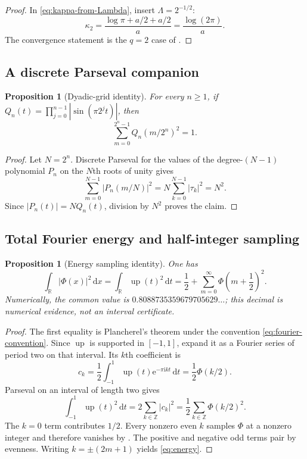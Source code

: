 \documentclass[11pt,oneside]{article}
\numberwithin{equation}{section}
\newtheorem{proposition}[theorem]{Proposition}
\theoremstyle{definition}
\theoremstyle{remark}
\newcommand{\R}{\mathbb R}
\newcommand{\Z}{\mathbb Z}
\newcommand{\e}{\mathrm e}
\newcommand{\ii}{\mathrm i}
\newcommand{\dd}{\,\mathrm d}
\newcommand{\up}{\operatorname{up}}
\newcommand{\PhiUp}{\Phi}
\newcommand{\TM}{\tau}
\begin{document}
\begin{proof}
In \eqref{eq:kappa-from-Lambda}, insert \(\Lambda=2^{-1/2}\):
\[
 \kappa_2=\frac{\log\pi+a/2+a/2}{a}=\frac{\log(2\pi)}{a}.
\]
The convergence statement is the \(q=2\) case of .
\end{proof}

\subsection{A discrete Parseval companion}

\begin{proposition}[Dyadic-grid identity]
\label{prop:grid-parseval}
For every \(n\ge1\), if
\(Q_n(t)=\prod_{j=0}^{n-1}|\sin(\pi2^jt)|\), then
\begin{equation}
 \sum_{m=0}^{2^n-1}Q_n(m/2^n)^2=1.
 \label{eq:grid-parseval}
\end{equation}
\end{proposition}

\begin{proof}
Let \(N=2^n\).  Discrete Parseval for the values of the degree-\((N-1)\) polynomial
\(P_n\) on the \(N\)th roots of unity gives
\[
 \sum_{m=0}^{N-1}|P_n(m/N)|^2
 =N\sum_{k=0}^{N-1}|\TM_k|^2=N^2.
\]
Since \(|P_n(t)|=NQ_n(t)\), division by \(N^2\) proves the claim.
\end{proof}

\subsection{Total Fourier energy and half-integer sampling}

\begin{proposition}[Energy sampling identity]
\label{prop:energy}
One has
\begin{equation}
 \int_{\R}|\PhiUp(x)|^2\dd x
 =\int_{\R}\up(t)^2\dd t
 =\frac12+\sum_{m=0}^{\infty}\PhiUp\!\left(m+\frac12\right)^2.
 \label{eq:energy}
\end{equation}
Numerically, the common value is
\(0.8088735359679705629\ldots\); this decimal is numerical evidence, not an interval
certificate.
\end{proposition}

\begin{proof}
The first equality is Plancherel's theorem under the convention
\eqref{eq:fourier-convention}.  Since \(\up\) is supported in \([-1,1]\), expand it as a
Fourier series of period two on that interval.  Its \(k\)th coefficient is
\[
 c_k=\frac12\int_{-1}^{1}\up(t)\e^{-\pi\ii kt}\dd t
 =\frac12\PhiUp(k/2).
\]
Parseval on an interval of length two gives
\[
 \int_{-1}^{1}\up(t)^2\dd t
 =2\sum_{k\in\Z}|c_k|^2
 =\frac12\sum_{k\in\Z}\PhiUp(k/2)^2.
\]
The \(k=0\) term contributes \(1/2\).  Every nonzero even \(k\) samples \(\PhiUp\) at a
nonzero integer and therefore vanishes by .  The positive and negative odd
terms pair by evenness.  Writing \(k=\pm(2m+1)\) yields \eqref{eq:energy}.
\end{proof}
\end{document}
